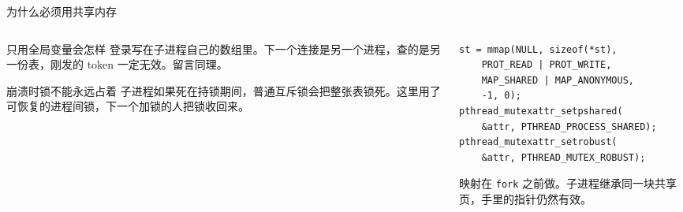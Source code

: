 \documentclass[aspectratio=169,11pt,professionalfonts]{ctexbeamer}
\begin{document}
\begin{frame}[fragile]{为什么必须用共享内存}
\begin{columns}[T,onlytextwidth]
\begin{column}{0.46\textwidth}
\begin{block}{只用全局变量会怎样}
{\small 登录写在子进程自己的数组里。下一个连接是另一个进程，查的是另一份表，刚发的 token 一定无效。留言同理。}
\end{block}
\vspace{0.35em}
\begin{block}{崩溃时锁不能永远占着}
{\small 子进程如果死在持锁期间，普通互斥锁会把整张表锁死。这里用了可恢复的进程间锁，下一个加锁的人把锁收回来。}
\end{block}
\end{column}
\begin{column}{0.50\textwidth}
\begin{lstlisting}[style=snippet]
st = mmap(NULL, sizeof(*st),
    PROT_READ | PROT_WRITE,
    MAP_SHARED | MAP_ANONYMOUS,
    -1, 0);
pthread_mutexattr_setpshared(
    &attr, PTHREAD_PROCESS_SHARED);
pthread_mutexattr_setrobust(
    &attr, PTHREAD_MUTEX_ROBUST);
\end{lstlisting}
{\scriptsize 映射在 \texttt{fork} 之前做。子进程继承同一块共享页，手里的指针仍然有效。}
\end{column}
\end{columns}
\end{frame}
\end{document}
